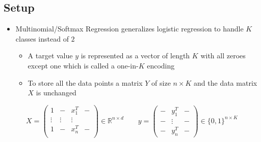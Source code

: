 \documentclass[11pt]{article}
\begin{document}
\subsection{Setup}
\label{sec:orgb794184}
\begin{itemize}
\item Multinomial/Softmax Regression generalizes logistic regression to handle \(K\) classes instead of \(2\)
\begin{itemize}
\item A target value \(y\) is represented as a vector of length \(K\) with all zeroes except one which is called a one-in-\(K\) encoding
\item To store all the data points a matrix \(Y\) of size \(n \times K\) and the data matrix \(X\) is unchanged
\end{itemize}
\end{itemize}
\begin{equation}
X=\begin{pmatrix} 
1&- & x_1^T & - \\
\vdots & \vdots & \vdots \\
1&- & x_n^T & - \\
\end{pmatrix}\in \mathbb{R}^{n \times d}\quad\quad 
y=\begin{pmatrix}
- & y_1^T & -\\
- & \vdots &- \\
- & y_n^T & -\end{pmatrix}\in\{0,1\}^{n\times K}
\end{equation}
\end{document}
